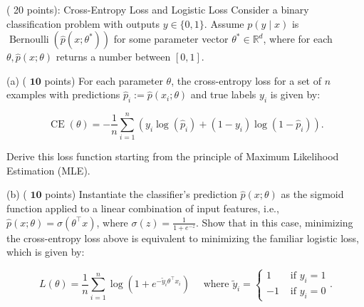 \documentclass[en,hazy,blue,12pt,normal]{elegantnote}
\begin{document}
\begin{homework}
    ( 20 points): Cross-Entropy Loss and Logistic Loss
Consider a binary classification problem with outputs $y \in\{0,1\}$. Assume $p(y \mid x)$ is $\operatorname{Bernoulli}\left(\hat{p}\left(x ; \theta^*\right)\right)$ for some parameter vector $\theta^* \in \mathbb{R}^d$, where for each $\theta, \hat{p}(x ; \theta)$ returns a number between $[0,1]$.

(a) ( $\mathbf{1 0}$ points) For each parameter $\theta$, the cross-entropy loss for a set of $n$ examples with predictions $\hat{p}_i:=\hat{p}\left(x_i ; \theta\right)$ and true labels $y_i$ is given by:

$$
\operatorname{CE}(\theta)=-\frac{1}{n} \sum_{i=1}^n\left(y_i \log \left(\hat{p}_i\right)+\left(1-y_i\right) \log \left(1-\hat{p}_i\right)\right) .
$$


Derive this loss function starting from the principle of Maximum Likelihood Estimation (MLE).

(b) ( $\mathbf{1 0}$ points) Instantiate the classifier's prediction $\hat{p}(x ; \theta)$ as the sigmoid function applied to a linear combination of input features, i.e., $\hat{p}(x ; \theta)=\sigma\left(\theta^{\top} x\right)$, where $\sigma(z)=\frac{1}{1+e^{-z}}$. Show that in this case, minimizing the cross-entropy loss above is equivalent to minimizing the familiar logistic loss, which is given by:

$$
L(\theta)=\frac{1}{n} \sum_{i=1}^n \log \left(1+e^{-\tilde{y}_i \theta^{\top} x_i}\right) \quad \text { where } \tilde{y}_i=\left\{\begin{array}{ll}
1 & \text { if } y_i=1 \\
-1 & \text { if } y_i=0
\end{array} .\right.
$$
\end{homework}
\end{document}
